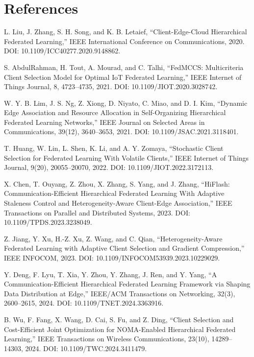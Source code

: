 \documentclass[11pt]{article}
\begin{document}
\section*{References}
\noindent [1] L. Liu, J. Zhang, S. H. Song, and K. B. Letaief, “Client-Edge-Cloud Hierarchical Federated Learning,” IEEE International Conference on Communications, 2020. DOI: 10.1109/ICC40277.2020.9148862.\par
\noindent [2] S. AbdulRahman, H. Tout, A. Mourad, and C. Talhi, “FedMCCS: Multicriteria Client Selection Model for Optimal IoT Federated Learning,” IEEE Internet of Things Journal, 8, 4723–4735, 2021. DOI: 10.1109/JIOT.2020.3028742.\par
\noindent [3] W. Y. B. Lim, J. S. Ng, Z. Xiong, D. Niyato, C. Miao, and D. I. Kim, “Dynamic Edge Association and Resource Allocation in Self-Organizing Hierarchical Federated Learning Networks,” IEEE Journal on Selected Areas in Communications, 39(12), 3640–3653, 2021. DOI: 10.1109/JSAC.2021.3118401.\par
\noindent [4] T. Huang, W. Lin, L. Shen, K. Li, and A. Y. Zomaya, “Stochastic Client Selection for Federated Learning With Volatile Clients,” IEEE Internet of Things Journal, 9(20), 20055–20070, 2022. DOI: 10.1109/JIOT.2022.3172113.\par
\noindent [5] X. Chen, T. Ouyang, Z. Zhou, X. Zhang, S. Yang, and J. Zhang, “HiFlash: Communication-Efficient Hierarchical Federated Learning With Adaptive Staleness Control and Heterogeneity-Aware Client-Edge Association,” IEEE Transactions on Parallel and Distributed Systems, 2023. DOI: 10.1109/TPDS.2023.3238049.\par
\noindent [6] Z. Jiang, Y. Xu, H.-Z. Xu, Z. Wang, and C. Qian, “Heterogeneity-Aware Federated Learning with Adaptive Client Selection and Gradient Compression,” IEEE INFOCOM, 2023. DOI: 10.1109/INFOCOM53939.2023.10229029.\par
\noindent [7] Y. Deng, F. Lyu, T. Xia, Y. Zhou, Y. Zhang, J. Ren, and Y. Yang, “A Communication-Efficient Hierarchical Federated Learning Framework via Shaping Data Distribution at Edge,” IEEE/ACM Transactions on Networking, 32(3), 2600–2615, 2024. DOI: 10.1109/TNET.2024.3363916.\par
\noindent [8] B. Wu, F. Fang, X. Wang, D. Cai, S. Fu, and Z. Ding, “Client Selection and Cost-Efficient Joint Optimization for NOMA-Enabled Hierarchical Federated Learning,” IEEE Transactions on Wireless Communications, 23(10), 14289–14303, 2024. DOI: 10.1109/TWC.2024.3411479.\par
\end{document}
